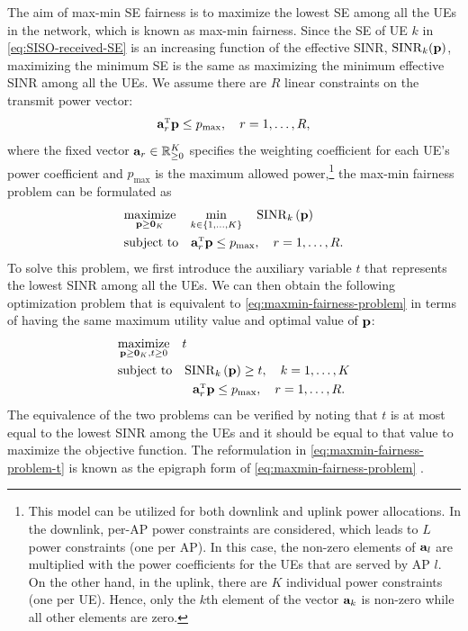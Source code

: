 The aim of max-min SE fairness is to maximize the lowest SE among all the UEs in the network, which is known as max-min fairness. Since the SE of UE $k$ in \eqref{eq:SISO-received-SE} is an increasing function of the effective SINR, $\mathrm{SINR}_k(\mathbf{p})$, maximizing the minimum SE is the same as maximizing the minimum effective SINR among all the UEs.
We assume there are $R$ linear constraints on the transmit power vector:
\begin{equation}
\vect{a}_r^{\Ttran}\vect{p}\leq p_{\textrm{max}}, \quad r=1,\ldots,R,
\end{equation}
where the fixed vector $\mathbf{a}_r\in \mathbb{R}_{\geq 0}^{K}$ specifies the weighting coefficient for each UE's power coefficient and $p_{\textrm{max}}$ is the maximum allowed power,\footnote{This model can be utilized for both downlink and uplink power allocations. In the downlink, per-AP power constraints are considered, which leads to $L$ power constraints (one per AP). In this case, the non-zero elements of $\mathbf{a}_{l}$ are multiplied with the power coefficients for the UEs that are served by AP $l$. On the other hand, in the uplink, there are $K$ individual power constraints (one per UE). Hence, only the $k$th element of the vector $\mathbf{a}_k$ is non-zero while all other elements are zero.} the max-min fairness problem can be formulated as
\begin{align} \label{eq:maxmin-fairness-problem}
&\underset{\vect{p} \geq \vect{0}_K}{\textrm{maximize}} \quad \min\limits_{k\in \{1,\ldots,K\}} \quad \mathrm{SINR}_k\left(\vect{p}\right) \\
&\textrm{subject to} \quad \vect{a}_r^{\Ttran}\vect{p}\leq p_{\textrm{max}}, \quad r=1,\ldots,R.  \nonumber
\end{align}
To solve this problem, we first introduce the auxiliary variable $t$ that represents the lowest SINR among all the UEs. We can then obtain the following optimization problem that is equivalent to \eqref{eq:maxmin-fairness-problem} in terms of having the same maximum utility value and optimal value of $\mathbf{p}$:
\begin{align} \label{eq:maxmin-fairness-problem-t}
&\underset{\vect{p}\geq \vect{0}_K, t \geq 0}{\textrm{maximize}} \quad t \\
&\textrm{subject to} \quad  \mathrm{SINR}_k\left(\vect{p}\right)\geq t, \quad k=1,\ldots,K \nonumber \\
&\hspace{21mm} \vect{a}_r^{\Ttran}\vect{p}\leq p_{\textrm{max}}, \quad r=1,\ldots,R.\nonumber
\end{align}
The equivalence of the two problems can be verified by noting that $t$ is at most equal to the lowest SINR among the UEs and it should be equal to that value to maximize the objective function. The reformulation in \eqref{eq:maxmin-fairness-problem-t} is known as the epigraph form of \eqref{eq:maxmin-fairness-problem} \cite[Sec.~3.1.7]{Boyd2004a}.

